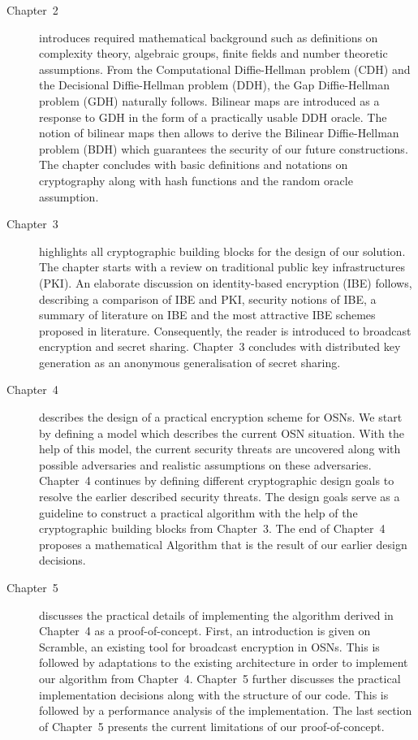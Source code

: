 \begin{description}
 \item[Chapter~2] introduces required mathematical background such as definitions on complexity theory, algebraic groups, finite fields and number theoretic assumptions. From the Computational Diffie-Hellman problem (CDH) and the Decisional Diffie-Hellman problem (DDH), the Gap Diffie-Hellman problem (GDH) naturally follows. Bilinear maps are introduced as a response to GDH in the form of a practically usable DDH oracle. The notion of bilinear maps then allows to derive the Bilinear Diffie-Hellman problem (BDH) which guarantees the security of our future constructions. The chapter concludes with basic definitions and notations on cryptography along with hash functions and the random oracle assumption.

 \item[Chapter~3] highlights all cryptographic building blocks for the design of our solution. The chapter starts with a review on traditional public key infrastructures (PKI). An elaborate discussion on identity-based encryption (IBE) follows, describing a comparison of IBE and PKI, security notions of IBE, a summary of literature on IBE and the most attractive IBE schemes proposed in literature. Consequently, the reader is introduced to broadcast encryption and secret sharing. Chapter~3 concludes with distributed key generation as an anonymous generalisation of secret sharing.

 \item[Chapter~4] describes the design of a practical encryption scheme for OSNs. We start by defining a model which describes the current OSN situation. With the help of this model, the current security threats are uncovered along with possible adversaries and realistic assumptions on these adversaries. Chapter~4 continues by defining different cryptographic design goals to resolve the earlier described security threats. The design goals serve as a guideline to construct a practical algorithm with the help of the cryptographic building blocks from Chapter~3. The end of Chapter~4 proposes a mathematical Algorithm that is the result of our earlier design decisions.

 \item[Chapter~5] discusses the practical details of implementing the algorithm derived in Chapter~4 as a proof-of-concept. First, an introduction is given on Scramble, an existing tool for broadcast encryption in OSNs. This is followed by adaptations to the existing architecture in order to implement our algorithm from Chapter~4. Chapter~5 further discusses the practical implementation decisions along with the structure of our code. This is followed by a performance analysis of the implementation. The last section of Chapter~5 presents the current limitations of our proof-of-concept.


\end{description}
